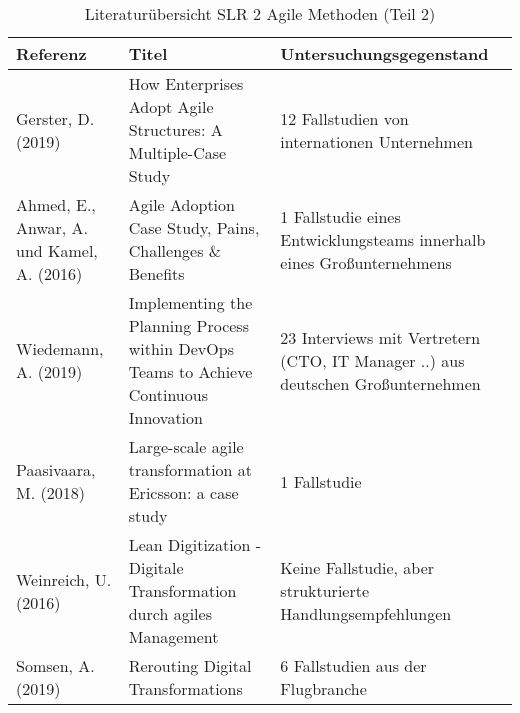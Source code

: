 \begin{table}[ht]
	\caption{Literaturübersicht SLR 2 Agile Methoden (Teil 2)}
	\centering
	\begin{tabularx}{500px}{|X|X|X|}
		\hline
		\textbf{Referenz}                                            & \textbf{Titel}                                                                                                                                                                   & \textbf{Untersuchungsgegenstand}                                                                                                                                         \\
		\hline
		Gerster, D. (2019)                                  & How Enterprises Adopt Agile Structures: A Multiple-Case Study                                                                                 & 12 Fallstudien von internationen Unternehmen                                                                \\
		Ahmed, E., Anwar, A. und Kamel, A. (2016)           & Agile Adoption Case Study, Pains, Challenges \& Benefits                                                                                      & 1 Fallstudie eines Entwicklungsteams innerhalb eines Großunternehmens                                       \\
		Wiedemann, A. (2019)                                & Implementing the Planning Process within DevOps Teams to Achieve Continuous Innovation                                                        & 23 Interviews mit Vertretern (CTO, IT Manager ..) aus deutschen Großunternehmen                             \\
		Paasivaara, M. (2018)                               & Large-scale agile transformation at Ericsson: a case study                                                                                    & 1 Fallstudie                                                                                                \\
		Weinreich, U. (2016)                                & Lean Digitization - Digitale Transformation durch agiles Management                                                                           & Keine Fallstudie, aber strukturierte Handlungsempfehlungen                                                  \\
		Somsen, A. (2019)                                   & Rerouting Digital Transformations                                                                                                             & 6 Fallstudien aus der Flugbranche                                                                           \\

\end{tabularx}
\end{table}
